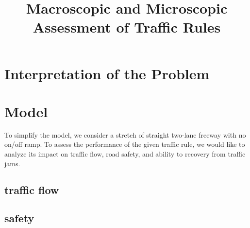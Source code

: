 \documentclass[aps,prl,superscriptaddress,12pt]{revtex4-1}
\begin{document}
	\title{Macroscopic and Microscopic Assessment of Traffic Rules }
		
	\begin{abstract}
		
	\end{abstract}
	
\maketitle

	\section{Interpretation of the Problem}


	\section{Model}
	To simplify the model, we consider a stretch of straight two-lane freeway with no on/off ramp. To assess the performance of the given traffic rule, we would like to analyze its impact on traffic flow, road safety, and ability to recovery from traffic jams.
	\subsection{traffic flow} 
	
	
	\subsection{safety}
	
	
\end{document}
